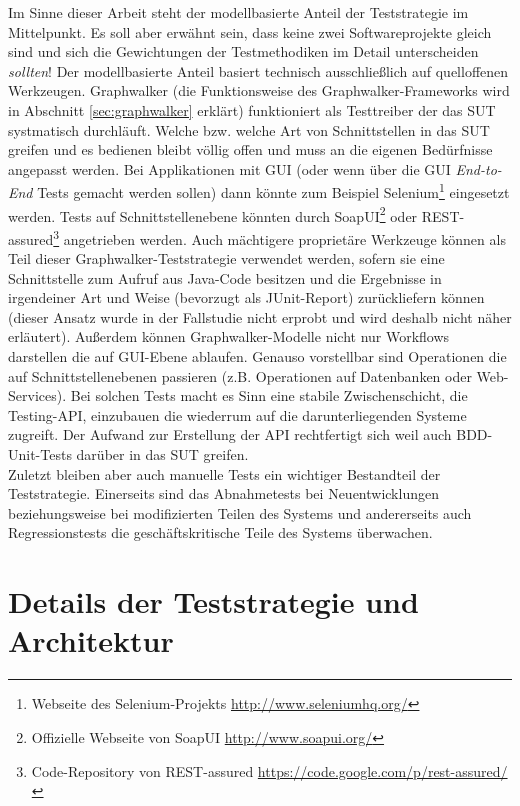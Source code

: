 Im Sinne dieser Arbeit steht der modellbasierte Anteil der Teststrategie im Mittelpunkt. Es soll aber erwähnt sein, dass keine zwei Softwareprojekte gleich sind und sich die Gewichtungen der Testmethodiken im Detail unterscheiden \textit{sollten}! Der modellbasierte Anteil basiert technisch ausschließlich auf quelloffenen Werkzeugen. Graphwalker (die Funktionsweise des Graphwalker-Frameworks wird in Abschnitt \ref{sec:graphwalker} erklärt) funktioniert als Testtreiber der das SUT systmatisch durchläuft. Welche bzw. welche Art von Schnittstellen in das SUT greifen und es bedienen bleibt völlig offen und muss an die eigenen Bedürfnisse angepasst werden. Bei Applikationen mit GUI (oder wenn über die GUI \textit{End-to-End} Tests gemacht werden sollen) dann könnte zum Beispiel Selenium\footnote{Webseite des Selenium-Projekts \url{http://www.seleniumhq.org/}} eingesetzt werden. Tests auf Schnittstellenebene könnten durch SoapUI\footnote{ Offizielle Webseite von SoapUI \url{http://www.soapui.org/}} oder REST-assured\footnote{Code-Repository von REST-assured \url{https://code.google.com/p/rest-assured/}} angetrieben werden. Auch mächtigere proprietäre Werkzeuge können als Teil dieser Graphwalker-Teststrategie verwendet werden, sofern sie eine Schnittstelle zum Aufruf aus Java-Code besitzen und die Ergebnisse in irgendeiner Art und Weise (bevorzugt als JUnit-Report) zurückliefern können (dieser Ansatz wurde in der Fallstudie nicht erprobt und wird deshalb nicht näher erläutert). Außerdem können Graphwalker-Modelle nicht nur Workflows darstellen die auf GUI-Ebene ablaufen. Genauso vorstellbar sind Operationen die auf Schnittstellenebenen passieren (z.B. Operationen auf Datenbanken oder Web-Services). Bei solchen Tests macht es Sinn eine stabile Zwischenschicht, die Testing-API, einzubauen die wiederrum auf die darunterliegenden Systeme zugreift. Der Aufwand zur Erstellung der API rechtfertigt sich weil auch BDD-Unit-Tests darüber in das SUT greifen.\\
Zuletzt bleiben aber auch manuelle Tests ein wichtiger Bestandteil der Teststrategie. Einerseits sind das Abnahmetests bei Neuentwicklungen beziehungsweise bei modifizierten Teilen des Systems und andererseits auch Regressionstests die geschäftskritische Teile des Systems überwachen.

\section{Details der Teststrategie und Architektur}

